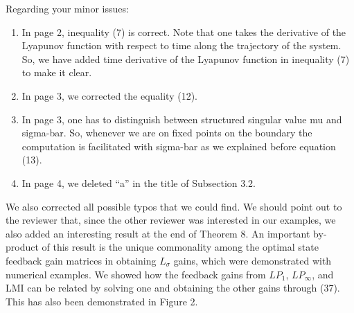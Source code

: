 \documentclass[reqno,8pt]{amsart}
\begin{document}
Regarding your minor issues:
\begin{enumerate}
    \item In page 2, inequality (7) is correct. Note that one takes the derivative of the Lyapunov function with respect to time along the trajectory of the system. So, we have added time derivative of the Lyapunov function in inequality (7) to make it clear. 
    \item In page 3, we corrected the equality (12).
    \item In page 3, one has to distinguish between structured singular value mu and sigma-bar. So, whenever we are on fixed points on the boundary the computation is facilitated with sigma-bar as we explained before equation (13). 
    \item In page 4, we deleted “a” in the title of Subsection 3.2.
\end{enumerate}

We also corrected all possible typos that we could find. We should point out to the reviewer that, since the other reviewer was interested in our examples, we also added an interesting result at the end of Theorem 8. An important by-product of this result is the unique commonality among the optimal state feedback gain matrices in obtaining $L_{\sigma}$ gains, which were demonstrated with numerical examples. We showed how the feedback gains from $LP_1$, $LP_{\infty}$, and LMI can be related by solving one and obtaining the other gains through (37). This has also been demonstrated in Figure 2.

%
%
\end{document}
